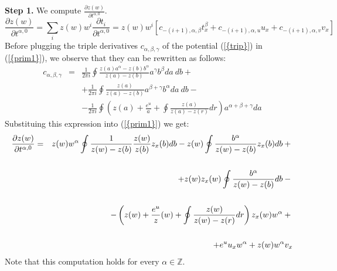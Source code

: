 \documentclass[numbook, envcountsame, envcountreset]{svjour3}
\begin{document}
{\bf Step 1.}  We compute $\frac{{\partial} z(w)}{{\partial} t^{\alpha,0}}$. 
\begin{equation}
\frac{{\partial} z(w)}{{\partial} t^{\alpha,0}} = \sum_i z(w) w^i \frac{{\partial} t_{i}}{{\partial} t^{\alpha,0}} = z(w) w^i 
\left[ c_{-(i+1),\alpha,\beta} t^{\beta}_x + c_{-(i+1),\alpha,u} u_x + c_{-(i+1),\alpha,v} v_x \right]\label{prim1}
\end{equation}
Before plugging the triple derivatives $c_{\alpha,\beta,\gamma}$ of the potential {(\ref{{trip}})} in {(\ref{{prim1}})}, we observe that they can be rewritten as follows:
\begin{eqnarray}
c_{\alpha,\beta,\gamma}&=&\frac1{2 \pi i}\oint \frac{z(a)a^\alpha-z(b)b^\alpha}{z(a)-z(b)} a^\gamma b^\beta da\ db +\\ 
&&+\frac1{2 \pi i}\oint \frac{z(a)}{z(a)-z(b)}a^{\beta+\gamma}b^{\alpha} da\ db -\\
&&-\frac1{2 \pi i}\oint \left(z(a)+\frac{e^u}a+\oint\frac{z(a)}{z(a)-z(r)}dr \right) a^{\alpha+\beta+\gamma} da
\end{eqnarray}
Substituing this expression into {(\ref{{prim1}})} we get:
\begin{eqnarray}
\frac{{\partial} z(w)}{{\partial} t^{\alpha,0}}&=&z(w)w^{\alpha}\oint\frac{1}{z(w)-z(b)}\frac{z(w)}{z(b)}z_x(b)db-
z(w)\oint\frac{b^\alpha}{z(w)-z(b)}z_x(b)db+{\nonumber}\\
&&
\label{prim:z(w)}\\
&&+z(w)z_x(w)\oint\frac{b^\alpha}{z(w)-z(b)}db-{\nonumber}\\
&&
{\nonumber}\\
&&-\left( z(w)+\frac{e^u}{z}(w)+\oint\frac{z(w)}{z(w)-z(r)}dr\right)z_x(w)w^\alpha+{\nonumber}\\
&&
{\nonumber}\\
&&+e^uu_xw^\alpha+z(w)w^\alpha v_x{\nonumber}
\end{eqnarray}
Note that this computation holds for every $\alpha\in \mathbb Z$. 
\end{document}
